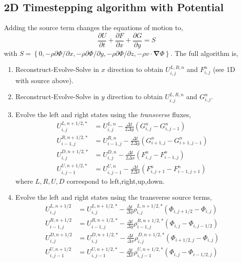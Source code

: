 \documentclass{article}
\newcommand{\ppderiv}[2]{\frac{\partial #1}{\partial #2}}
\newcommand{\del}{\mathbf{\nabla}}
\begin{document}
\subsection{2D Timestepping algorithm with Potential} 
Adding the source term changes the equations of motion to,
\begin{equation}
	\ppderiv{U}{t} +\ppderiv{F}{x}  + \ppderiv{G}{y} = S
\end{equation}
with  $S = \left\{0,-\rho \partial \Phi/ \partial x, -\rho \partial \Phi / \partial y , -\rho \partial \Phi/\partial z, -\rho v \cdot \del \Phi \right\}$.
The full algorithm is,
\begin{enumerate}
	\item Reconstruct-Evolve-Solve in $x$ direction to obtain $U_{i,j}^{L,R,n}$ and $F_{i,j}^n$ (see 1D with source above).
	\item Reconstruct-Evolve-Solve in $y$ direction to obtain $U_{i,j}^{L,R,n}$ and $G_{i,j}^n$.  
	\item Evolve the left and right states using the \emph{transverse} fluxes, 
	\begin{align}
		U_{i,j}^{L,n+1/2,*} &= U_{i,j}^{L,n} - \frac{\Delta t}{2 \Delta y} \left( G_{i,j}^n - G_{i,j-1}^n \right) \\
		U_{i-1,j}^{R,n+1/2,*} &= U_{i-1,j}^{R,n} - \frac{\Delta t}{2 \Delta y} \left( G_{i+1,j}^n - G_{i+1,j-1}^n \right) \\
		U_{i,j}^{D,n+1/2,*} &= U_{i,j}^{D,n} - \frac{\Delta t}{2 \Delta x} \left( F_{i,j}^n - F_{i-1,j}^n \right) \\
		U_{i,j-1}^{U,n+1/2,*} &= U_{i,j-1}^{U,n} - \frac{\Delta t}{2 \Delta x} \left( F_{i,j+1}^n - F_{i-1,j+1}^n \right)
	\end{align}
	where $L,R,U,D$ correspond to left,right,up,down. 
	\item Evolve the left and right states using the transverse source terms, 
	\begin{align}
		U_{i,j}^{L,n+1/2} &= U_{i,j}^{L,n+1/2,*} - \frac{\Delta t}{\Delta y} \rho_{i,j}^{L,n+1/2,*} \left(\Phi_{i,j+1/2}-\Phi_{i,j}\right) \\
		U_{i-1,j}^{R,n+1/2} &= U_{i-1,j}^{R,n+1/2,*}  - \frac{\Delta t}{\Delta y} \rho_{i-1,j}^{R,n+1/2,*}\left(\Phi_{i,j}-\Phi_{i,j-1/2}\right) \\
		U_{i,j}^{D,n+1/2} &= U_{i,j}^{D,n+1/2,*} - \frac{\Delta t}{\Delta x} \rho_{i,j}^{D,n+1/2,*} \left(\Phi_{i+1/2,j}-\Phi_{i,j}\right) \\
		U_{i,j-1}^{U,n+1/2} &= U_{i,j-1}^{U,n+1/2,*}  - \frac{\Delta t}{\Delta x} \rho_{i,j-1}^{U,n+1/2,*}\left(\Phi_{i,j}-\Phi_{i-1/2,j}\right) \\

\end{align}
\end{enumerate}
\end{document}
